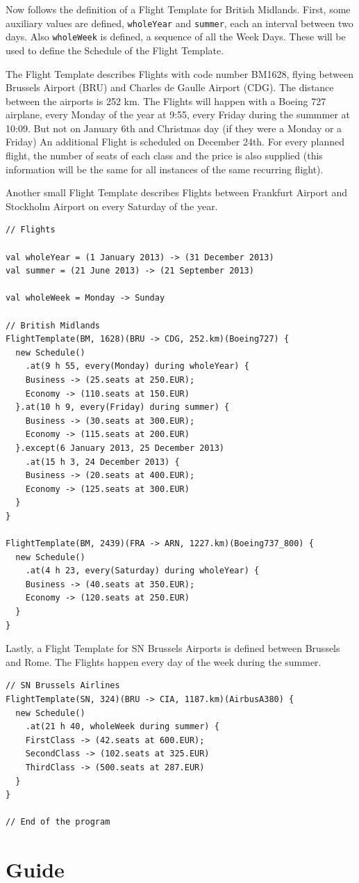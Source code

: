 \documentclass[a4paper]{article}
\renewcommand{\sc}[1]{\lstinline{#1}}
\begin{document}
Now follows the definition of a Flight Template for British Midlands.
First, some auxiliary values are defined, \sc{wholeYear} and \sc{summer}, each an interval between two days.
Also \sc{wholeWeek} is defined, a sequence of all the Week Days.
These will be used to define the Schedule of the Flight Template.

The Flight Template describes Flights with code number BM1628, flying between Brussels Airport (BRU) and Charles de Gaulle Airport (CDG).
The distance between the airports is 252 km.
The Flights will happen with a Boeing 727 airplane, every Monday of the year at 9:55, every Friday during the summmer at 10:09.
But not on January 6th and Christmas day (if they were a Monday or a Friday)
An additional Flight is scheduled on December 24th.
For every planned flight, the number of seats of each class and the price is also supplied (this information will be the same for all instances of the same recurring flight).

Another small Flight Template describes Flights between Frankfurt Airport and Stockholm Airport on every Saturday of the year.

\begin{lstlisting}
// Flights

val wholeYear = (1 January 2013) -> (31 December 2013)
val summer = (21 June 2013) -> (21 September 2013)

val wholeWeek = Monday -> Sunday

// British Midlands
FlightTemplate(BM, 1628)(BRU -> CDG, 252.km)(Boeing727) {
  new Schedule()
    .at(9 h 55, every(Monday) during wholeYear) {
    Business -> (25.seats at 250.EUR);
    Economy -> (110.seats at 150.EUR)
  }.at(10 h 9, every(Friday) during summer) {
    Business -> (30.seats at 300.EUR);
    Economy -> (115.seats at 200.EUR)
  }.except(6 January 2013, 25 December 2013)
    .at(15 h 3, 24 December 2013) {
    Business -> (20.seats at 400.EUR);
    Economy -> (125.seats at 300.EUR)
  }
}

FlightTemplate(BM, 2439)(FRA -> ARN, 1227.km)(Boeing737_800) {
  new Schedule()
    .at(4 h 23, every(Saturday) during wholeYear) {
    Business -> (40.seats at 350.EUR);
    Economy -> (120.seats at 250.EUR)
  }
}
\end{lstlisting}

Lastly, a Flight Template for SN Brussels Airports is defined between Brussels and Rome.
The Flights happen every day of the week during the summer.

\begin{lstlisting}
// SN Brussels Airlines
FlightTemplate(SN, 324)(BRU -> CIA, 1187.km)(AirbusA380) {
  new Schedule()
    .at(21 h 40, wholeWeek during summer) {
    FirstClass -> (42.seats at 600.EUR);
    SecondClass -> (102.seats at 325.EUR)
    ThirdClass -> (500.seats at 287.EUR)
  }
}

// End of the program
\end{lstlisting}


\section{Guide}
\label{sec:guide}

\end{document}
